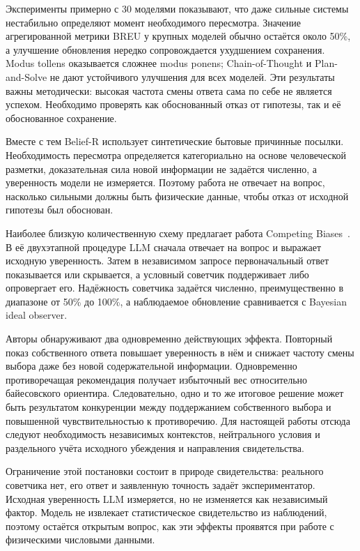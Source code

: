 \documentclass[a4paper,14pt]{extarticle}
\begin{document}
Эксперименты примерно с 30 моделями показывают, что даже сильные системы нестабильно определяют момент необходимого пересмотра. Значение агрегированной метрики BREU у крупных моделей обычно остаётся около 50\%, а улучшение обновления нередко сопровождается ухудшением сохранения. Modus tollens оказывается сложнее modus ponens; Chain-of-Thought и Plan-and-Solve не дают устойчивого улучшения для всех моделей. Эти результаты важны методически: высокая частота смены ответа сама по себе не является успехом. Необходимо проверять как обоснованный отказ от гипотезы, так и её обоснованное сохранение.

Вместе с тем Belief-R использует синтетические бытовые причинные посылки. Необходимость пересмотра определяется категориально на основе человеческой разметки, доказательная сила новой информации не задаётся численно, а уверенность модели не измеряется. Поэтому работа не отвечает на вопрос, насколько сильными должны быть физические данные, чтобы отказ от исходной гипотезы был обоснован.

Наиболее близкую количественную схему предлагает работа Competing Biases~\cite{competingbiases}. В её двухэтапной процедуре LLM сначала отвечает на вопрос и выражает исходную уверенность. Затем в независимом запросе первоначальный ответ показывается или скрывается, а условный советчик поддерживает либо опровергает его. Надёжность советчика задаётся численно, преимущественно в диапазоне от 50\% до 100\%, а наблюдаемое обновление сравнивается с Bayesian ideal observer.

Авторы обнаруживают два одновременно действующих эффекта. Повторный показ собственного ответа повышает уверенность в нём и снижает частоту смены выбора даже без новой содержательной информации. Одновременно противоречащая рекомендация получает избыточный вес относительно байесовского ориентира. Следовательно, одно и то же итоговое решение может быть результатом конкуренции между поддержанием собственного выбора и повышенной чувствительностью к противоречию. Для настоящей работы отсюда следуют необходимость независимых контекстов, нейтрального условия и раздельного учёта исходного убеждения и направления свидетельства.

Ограничение этой постановки состоит в природе свидетельства: реального советчика нет, его ответ и заявленную точность задаёт экспериментатор. Исходная уверенность LLM измеряется, но не изменяется как независимый фактор. Модель не извлекает статистическое свидетельство из наблюдений, поэтому остаётся открытым вопрос, как эти эффекты проявятся при работе с физическими числовыми данными.
\end{document}
